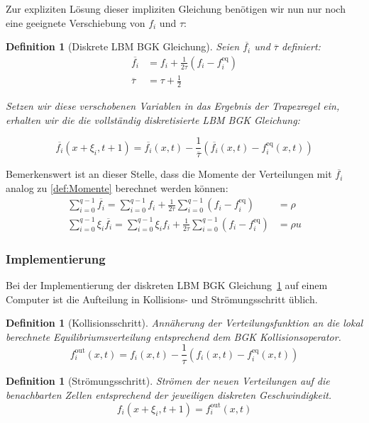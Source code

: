 \documentclass[12pt,a4paper]{scrartcl}
\newtheorem{Definition}[Satz]{Definition}
\numberwithin{equation}{section}
\begin{document}
Zur expliziten Lösung dieser impliziten Gleichung benötigen wir nun nur noch eine geeignete Verschiebung von \(f_i\) und \(\tau\):

\begin{Definition}[Diskrete LBM BGK Gleichung]
\label{def:LBGKeq}
Seien \(\overline{f_i}\) und \(\overline\tau\) definiert:
\begin{align*}
\overline{f_i} &= f_i + \frac{1}{2\tau}(f_i - f_i^\text{eq}) \\
\overline\tau &= \tau + \frac{1}{2}
\end{align*}

Setzen wir diese verschobenen Variablen in das Ergebnis der Trapezregel ein, erhalten \cite[Kap.~A.5 mit \(\Delta t=1\)]{krueger17} wir die die vollständig diskretisierte LBM BGK Gleichung:

\[\overline{f_i}(x+\xi_i,t+1) = \overline{f_i}(x,t) - \frac{1}{\overline\tau} (\overline{f_i}(x,t) - f_i^\text{eq}(x,t))\]
\end{Definition}

Bemerkenswert ist an dieser Stelle, dass die Momente der Verteilungen mit \(\overline{f_i}\) analog zu \ref{def:Momente} berechnet werden können:
\begin{align*}
\sum_{i=0}^{q-1} \overline{f_i} = \sum_{i=0}^{q-1} f_i + \frac{1}{2\tau} \sum_{i=0}^{q-1} (f_i - f_i^\text{eq}) &= \rho \\
\sum_{i=0}^{q-1} \xi_i \overline{f_i} = \sum_{i=0}^{q-1} \xi_i f_i + \frac{1}{2\tau} \sum_{i=0}^{q-1} (f_i - f_i^\text{eq}) &= \rho u
\end{align*}

\newpage
\subsubsection{Implementierung}

Bei der Implementierung der {diskreten LBM BGK Gleichung}~\ref{def:LBGKeq} auf einem Computer ist die Aufteilung in Kollisions- und Strömungsschritt üblich.

\begin{Definition}[Kollisionsschritt]
Annäherung der Verteilungsfunktion an die lokal berechnete Equilibriumsverteilung entsprechend dem BGK Kollisionsoperator.
\[f_i^\text{out}(x,t) = f_i(x,t) - \frac{1}{\tau}(f_i(x,t) - f_i^\text{eq}(x,t))\]
\end{Definition}

\begin{Definition}[Strömungsschritt]
Strömen der neuen Verteilungen auf die benachbarten Zellen entsprechend der jeweiligen diskreten Geschwindigkeit.
\[f_i(x+\xi_i,t+1) = f_i^\text{out}(x,t)\]
\end{Definition}
\end{document}
